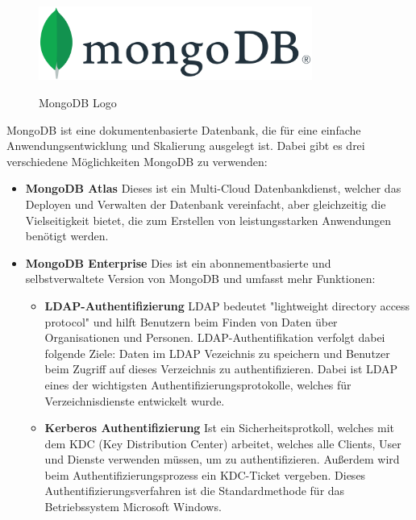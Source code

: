\begin{figure}[h!]
    \centering
    \includegraphics[width=0.8\textwidth]{pics/mongodb.png}
    \caption{MongoDB Logo}
    \cite{database_mongodb_logo}
    \label{fig:enter-label}
\end{figure}
MongoDB ist eine dokumentenbasierte Datenbank, die für eine einfache Anwendungsentwicklung und Skalierung ausgelegt ist. Dabei gibt es drei verschiedene Möglichkeiten MongoDB zu verwenden: 
\begin{itemize}
    \item \textbf{MongoDB Atlas}
        \newline
        Dieses ist ein Multi-Cloud Datenbankdienst, welcher das Deployen und Verwalten der Datenbank vereinfacht, aber gleichzeitig die Vielseitigkeit bietet, die zum Erstellen von leistungsstarken Anwendungen benötigt werden.
    \item \textbf{MongoDB Enterprise}
        \newline
        Dies ist ein abonnementbasierte und selbstverwaltete Version von MongoDB und umfasst mehr Funktionen:
        \begin{itemize}
            \item \textbf{LDAP-Authentifizierung}
                \newline
                LDAP bedeutet "lightweight directory access protocol" und hilft Benutzern beim Finden von Daten über Organisationen und Personen. LDAP-Authentifikation verfolgt dabei folgende Ziele: Daten im LDAP Vezeichnis zu speichern und Benutzer beim Zugriff auf dieses Verzeichnis zu authentifizieren. Dabei ist LDAP eines der wichtigsten Authentifizierungsprotokolle, welches für Verzeichnisdienste entwickelt wurde.
                \cite{ldap_auth}
            \item \textbf{Kerberos Authentifizierung}
                \newline
                Ist ein Sicherheitsprotkoll, welches mit dem KDC (Key Distribution Center) arbeitet, welches alle Clients, User und Dienste verwenden müssen, um zu authentifizieren. Außerdem wird beim Authentifizierungsprozess ein KDC-Ticket vergeben. Dieses Authentifizierungsverfahren ist die Standardmethode für das Betriebssystem Microsoft Windows.

\end{itemize}
\end{itemize}
